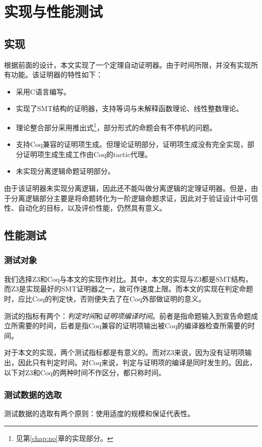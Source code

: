 \chapter{实现与性能测试}
\label{chap:test}

\section{实现}
根据前面的设计，本文实现了一个定理自动证明器。由于时间所限，并没有实现所有功能。该证明器的特性如下：
\begin{itemize}
  \item 采用C语言编写。
  \item 实现了SMT结构的证明器，支持等词与未解释函数理论、线性整数理论。
  \item 理论整合部分采用推出式\footnote{见第\ref{chap:no}章的实现部分。}，部分形式的命题会有不停机的问题。
  \item 支持Coq兼容的证明项生成。但理论证明部分，证明项生成没有完全实现，部分证明项生成生成工作由Coq的tactic代理。
  \item 未实现分离逻辑命题证明部分。
\end{itemize}

由于该证明器未实现分离逻辑，因此还不能叫做分离逻辑的定理证明器。但是，由于分离逻辑部分主要是将命题转化为一阶逻辑命题求证，因此对于验证设计中可信性、自动化的目标，以及评价性能，仍然具有意义。

\section{性能测试}
\subsection{测试对象}
我们选择Z3和Coq与本文的实现作对比。其中，本文的实现与Z3都是SMT结构，而Z3是实现最好的SMT证明器之一，故可作速度上限。而本文的实现在判定命题时，应比Coq的判定快，否则便失去了在Coq外部做证明的意义。

测试的指标有两个：\emph{判定时间}和\emph{证明项编译时间}。前者是指命题输入到宣告命题成立所需要的时间，后者是指Coq兼容的证明项输出被Coq的编译器检查所需要的时间。

对于本文的实现，两个测试指标都是有意义的。而对Z3来说，因为没有证明项输出，因此只有判定时间。对Coq来说，判定与证明项的编译是同时发生的。因此，以下对Z3和Coq的两种时间不作区分，都只称时间。

\subsection{测试数据的选取}
测试数据的选取有两个原则：使用适度的规模和保证代表性。

